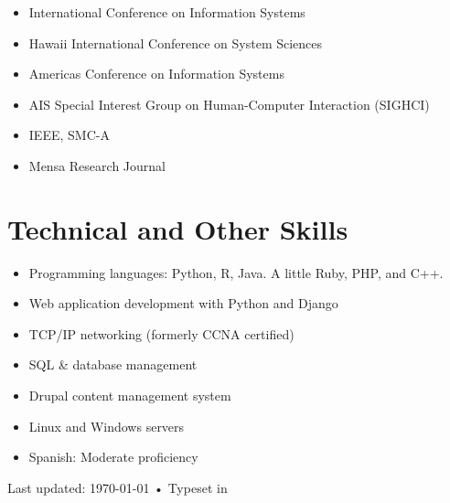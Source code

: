 \documentclass[10pt, a4paper]{article}
\begin{document}
\begin{itemize}
\itemsep0em
\item International Conference on Information Systems
\item Hawaii International Conference on System Sciences
\item Americas Conference on Information Systems
\item AIS Special Interest Group on Human-Computer Interaction (SIGHCI)
\item IEEE, SMC-A
\item Mensa Research Journal
\end{itemize}


\section*{Technical and Other Skills}

\begin{itemize}
\itemsep0em
\item Programming languages: Python, R, Java. A little Ruby, PHP, and C++.
\item Web application development with Python and Django
\item TCP/IP networking (formerly CCNA certified)
\item SQL \& database management
\item Drupal content management system
\item Linux and Windows servers
\item Spanish: Moderate proficiency
\end{itemize}


\vfill{}

\begin{center}
{\scriptsize  Last updated: \today\- •\- 
Typeset in \href{http://nitens.org/taraborelli/cvtex}{
\XeTeX }\\
}
\end{center}
\end{document}
